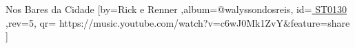 \beginsong
{Nos Bares da Cidade %
}[by={Rick e Renner %
},album={@walyssondosreis},
id={\href{ https://music.youtube.com/watch?v=c6wJ0Mk1ZvY&feature=share
}{ ST0130  %
}},rev={5}, %
qr={ https://music.youtube.com/watch?v=c6wJ0Mk1ZvY&feature=share %
}]
\beginverse
